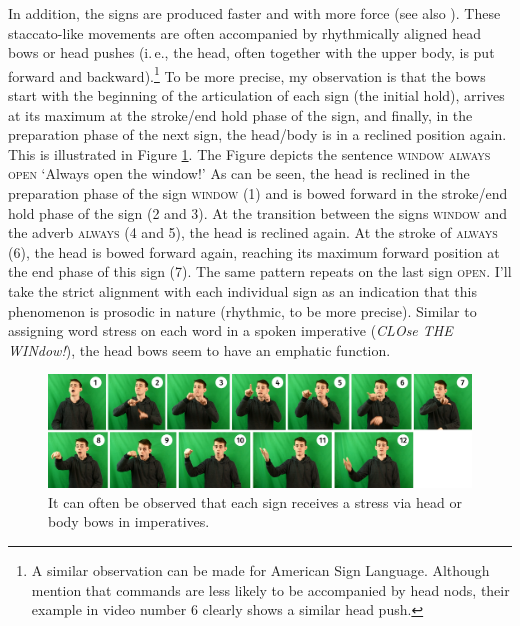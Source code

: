 In addition, the signs are produced faster and with more force (see also \citealt[341]{happ2014vork}). These staccato-like movements are often accompanied by rhythmically aligned head bows or head pushes (i.\,e., the head, often together with the upper body, is put forward and backward).\footnote{ A similar observation can be made for American Sign Language. Although \citet{brentari2018production} mention that commands are less likely to be accompanied by head nods, their example in video number 6 clearly shows a similar head push.} To be more precise, my observation is that the bows start with the beginning of the articulation of each sign (the initial hold), arrives at its maximum at the stroke/end hold phase of the sign, and finally, in the preparation phase of the next sign, the head/body is in a reclined position again. This is illustrated in Figure \ref{fig:headmoveimp}. The Figure depicts the sentence \textsc{window always open} `Always open the window!' As can be seen, the head is reclined in the preparation phase of the sign \textsc{window} (1) and is bowed forward in the stroke/end hold phase of the sign (2 and 3). At the transition between the signs \textsc{window} and the adverb \textsc{always} (4 and 5), the head is reclined again.  At the stroke of \textsc{always} (6), the head is bowed forward again, reaching its maximum forward position at the end phase of this sign (7). The same pattern repeats on the last sign \textsc{open}. I'll take the strict alignment with each individual sign as an indication that this phenomenon is prosodic in nature (rhythmic, to be more precise). Similar to assigning word stress on each word in a spoken imperative (\textit{CLOse THE WINdow!}), the head bows seem to have an emphatic function.%

\begin{figure}[bt]
\centering
	\includegraphics[width=1.0\textwidth]{imperativeheadmovement.jpg}
	\caption{It can often be observed that each sign receives a stress via head or body bows in imperatives.}
	\label{fig:headmoveimp}
\end{figure}

